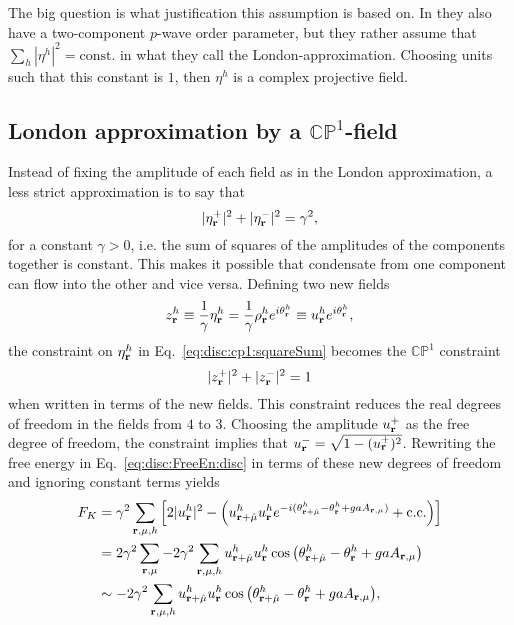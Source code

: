 The big question is what justification this assumption is based on. In \cite{shimizu12} they also have a two-component $p$-wave order parameter, but they rather assume that
$\sum_h|\eta^h|^2 = \text{const.}$ in what they call the London-approximation. Choosing units such that this constant is $1$, then $\eta^h$ is a complex projective field.

\subsection{London approximation by a $\mathbb{CP}^1$-field}

Instead of fixing the amplitude of each field as in the London approximation, a less strict approximation is to say that
\begin{equation}
  |\eta^+_{\boldsymbol{\mathbf{r}}}|^2 + |\eta^-_{\boldsymbol{\mathbf{r}}}|^2 = \gamma^2,
  \label{eq:disc:cp1:squareSum}
\end{equation}
for a constant $\gamma>0$, i.e. the sum of squares of the amplitudes of the components together is constant. This makes it possible that condensate from one component can flow into the other
and vice versa. Defining two new fields
\begin{equation}
  z^h_{\boldsymbol{\mathbf{r}}} \equiv \frac{1}{\gamma}\eta^h_{\boldsymbol{\mathbf{r}}} = \frac{1}{\gamma}\rho^h_{\boldsymbol{\mathbf{r}}}e^{i\theta^h_{\boldsymbol{\mathbf{r}}}} \equiv u^h_{\boldsymbol{\mathbf{r}}}e^{i\theta^h_{\boldsymbol{\mathbf{r}}}},
  \label{eq:disc:cp1:zFields}
\end{equation}
the constraint on $\eta^h_{\boldsymbol{\mathbf{r}}}$ in Eq.~\eqref{eq:disc:cp1:squareSum} becomes the $\mathbb{CP}^1$ constraint
\begin{equation}
  |z^+_{\boldsymbol{\mathbf{r}}}|^2 + |z^-_{\boldsymbol{\mathbf{r}}}|^2 = 1
  \label{eq:disc:cp1:cp1Constraint}
\end{equation}
when written in terms of the new fields. This constraint reduces the real degrees of freedom in the fields from $4$ to $3$. Choosing the amplitude $u^+_{\boldsymbol{\mathbf{r}}}$ as the free degree of freedom,
the constraint implies that $u^-_{\boldsymbol{\mathbf{r}}}= \sqrt{1-(u^+_{\boldsymbol{\mathbf{r}}})^2}$. Rewriting the free energy in Eq.~\eqref{eq:disc:FreeEn:disc} in terms of these new degrees of freedom and ignoring constant terms yields
\begin{equation}
  \begin{split}
	F_K &= \gamma^2\sum_{{\boldsymbol{\mathbf{r}}},\mu,h}\Big[2|u^h_{\boldsymbol{\mathbf{r}}}|^2 - \Big(u^h_{{\boldsymbol{\mathbf{r}}}+\hat{\mu}}u^h_{\boldsymbol{\mathbf{r}}}e^{-i(\theta^h_{{\boldsymbol{\mathbf{r}}}+\hat{\mu}}-\theta^h_{\boldsymbol{\mathbf{r}}} + gaA_{{\boldsymbol{\mathbf{r}}},\mu})} + \text{c.c.}\Big)\Big]\\
  &= 2\gamma^2\sum_{{\boldsymbol{\mathbf{r}}},\mu} - 2\gamma^2\sum_{{\boldsymbol{\mathbf{r}}},\mu,h}u^h_{{\boldsymbol{\mathbf{r}}}+\hat{\mu}}u^h_{\boldsymbol{\mathbf{r}}}\cos\big(\theta^h_{{\boldsymbol{\mathbf{r}}}+\hat{\mu}}-\theta^h_{\boldsymbol{\mathbf{r}}} + gaA_{{\boldsymbol{\mathbf{r}}},\mu}\big)\\
	&\sim -2\gamma^2\sum_{{\boldsymbol{\mathbf{r}}},\mu,h}u^h_{{\boldsymbol{\mathbf{r}}}+\hat{\mu}}u^h_{\boldsymbol{\mathbf{r}}}\cos\big(\theta^h_{{\boldsymbol{\mathbf{r}}}+\hat{\mu}} - \theta^h_{\boldsymbol{\mathbf{r}}} + gaA_{{\boldsymbol{\mathbf{r}}},\mu}\big),
  \end{split}
  \label{eq:disc:cp1:FK}
\end{equation}
